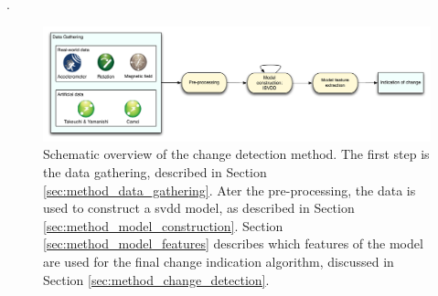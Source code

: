 
.


\begin{figure}
  \centering
    \includegraphics[width=\textwidth,height=\textheight,keepaspectratio]{./Figures/chapter4/method_setup_short.pdf}
  \caption[Method setup]{Schematic overview of the change detection method. The first step is the data gathering, described in Section \ref{sec:method_data_gathering}. Ater the pre-processing, the data is used to construct a \gls{svdd} model, as described in Section \ref{sec:method_model_construction}. Section \ref{sec:method_model_features} describes which features of the model are used for the final change indication algorithm, discussed in Section \ref{sec:method_change_detection}.}
  \label{fig:method_overview_short}
\end{figure}






% 
% 

